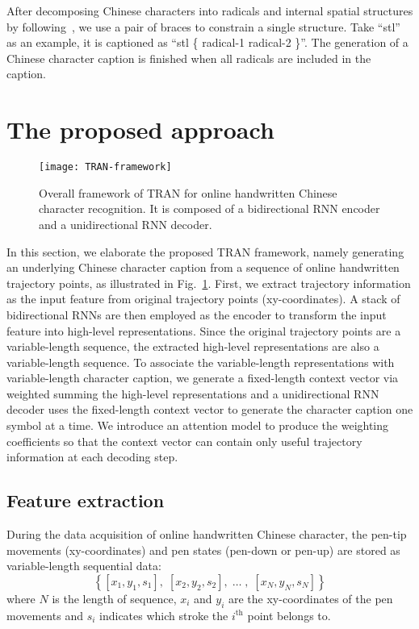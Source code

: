 \documentclass[a4paper,conference]{IEEEtran}
\begin{document}
After decomposing Chinese characters into radicals and internal spatial structures by following~\cite{cjk-decomp}, we use a pair of braces to constrain a single structure. Take ``stl'' as an example, it is captioned as ``stl \{ radical-1 radical-2 \}''. The generation of a Chinese character caption is finished when all radicals are included in the caption.


\section{The proposed approach}
\label{sec:The proposed approach}

\begin{figure}
\centering
\texttt{[image: TRAN-framework]}
\caption{Overall framework of TRAN for online handwritten Chinese character recognition. It is composed of a bidirectional RNN encoder and a unidirectional RNN decoder.}
\label{fig:TRAN-framework}
\end{figure}

In this section, we elaborate the proposed TRAN framework, namely generating an underlying Chinese character caption from a sequence of online handwritten trajectory points, as illustrated in Fig.~\ref{fig:TRAN-framework}. First, we extract trajectory information as the input feature from original trajectory points (xy-coordinates). A stack of bidirectional RNNs are then employed as the encoder to transform the input feature into high-level representations. Since the original trajectory points are a variable-length sequence, the extracted high-level representations are also a variable-length sequence. To associate the variable-length representations with variable-length character caption, we generate a fixed-length context vector via weighted summing the high-level representations and a unidirectional RNN decoder uses the fixed-length context vector to generate the character caption one symbol at a time. We introduce an attention model to produce the weighting coefficients so that the context vector can contain only useful trajectory information at each decoding step.

\subsection{Feature extraction}
\label{sec:Feature extraction}
During the data acquisition of online handwritten Chinese character, the pen-tip movements (xy-coordinates) and pen states (pen-down or pen-up) are stored as variable-length sequential data:
\begin{equation}\label{eq:trajectory input}
\left \{\left[ {{x_1},{y_1},{s_1}} \right],\;\left[ {{x_2},{y_2},{s_2}} \right],\; \ldots \;,\;\left[ {{x_N},{y_N},{s_N}} \right] \right\}
\end{equation}
where $N$ is the length of sequence, ${x_i}$ and ${y_i}$ are the xy-coordinates of the pen movements and ${s_i}$ indicates which stroke the $i^{\textrm{th}}$ point belongs to.
\end{document}
